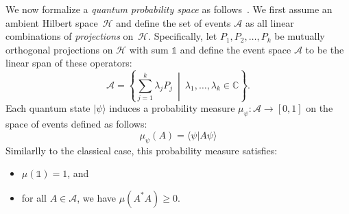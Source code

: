 \documentclass{article}
\theoremstyle{remark}
\newcommand{\qevents}{\ensuremath{\mathcal{A}}}
\newcommand{\Hilb}{\mathcal{H}}
\newcommand{\ket}[1]{|#1\rangle}
\newcommand{\ip}[2]{\langle #1 | #2 \rangle}
\newcommand{\yutsung}[1]{\fbox{\begin{minipage}{0.9\textwidth}\color{purple}{Yu-Tsung says: #1}\end{minipage}}}
\begin{document}
We now formalize a \emph{quantum probability space} as
follows~\cite{Maassen2010,Swart2013}. We first assume an ambient
Hilbert space~$\Hilb$ and define the set of events $\qevents$ as all
linear combinations of \emph{projections} on~$\Hilb$. Specifically,
let $P_1, P_2, \ldots, P_k$ be mutually orthogonal projections on
$\Hilb$ with sum $\mathbb{1}$ and define the event space $\qevents$ to
be the linear span of these operators:
\[
\qevents=\left\{ \sum_{j=1}^{k}\lambda_{j}P_{j}~\middle|~\lambda_{1},\ldots,\lambda_{k}\in\mathbb{C}\right\} .
\]
Each quantum state $\ket{\psi}$ induces a probability measure
$\mu_\psi : \qevents \rightarrow [0,1]$ on the space of events
defined as follows:
\[
\mu_\psi(A) = \ip{\psi}{A\psi}
\]
Similarlly to the classical case, this probability measure satisfies:
\begin{itemize}
\item $\mu(\mathbb{1}) = 1$, and
\item for all $A \in \qevents$, we have $\mu(A^*A) \geq 0$.
\end{itemize}


\end{document}
